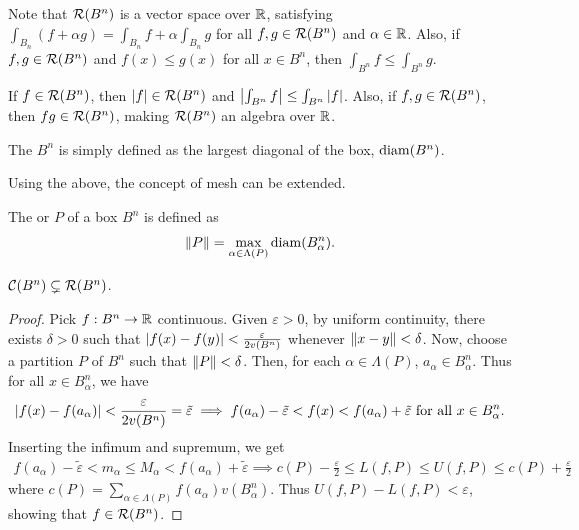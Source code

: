 Note that $\mathcal{R}(B^{n})$ is a vector space over $\mathbb{R}$, satisfying $\int_{B_{n}} (f + \alpha g) = \int_{B_{n}} f + \alpha \int_{B_{n}} g$ for all $f,g \in \mathcal{R}(B^{n})$ and $\alpha \in \mathbb{R}$. Also, if $f,g \in \mathcal{R}(B^{n})$ and $f(x) \leq g(x)$ for all $x \in B^{n}$, then $\int_{B^{n}} f \leq \int_{B^{n}} g$.

If $f \in \mathcal{R}(B^{n})$, then $\left| f \right| \in \mathcal{R}(B^{n})$ and $\left| \int_{B^{n}} f \right| \leq \int_{B^{n}} \left| f \right|$. Also, if $f,g \in \mathcal{R}(B^{n})$, then $fg \in \mathcal{R}(B^{n})$, making $\mathcal{R}(B^{n})$ an algebra over $\mathbb{R}$.

\begin{definition}
    The  $B^{n}$ is simply defined as the largest diagonal of the box, $\operatorname{diam}(B^{n})$.
\end{definition}

Using the above, the concept of mesh can be extended.
\begin{definition}
    The  or  $P$ of a box $B^{n}$ is defined as
    \begin{align}
        \left\lVert P\right\rVert = \max_{\alpha \in \Lambda(P)} \operatorname{diam}(B_{\alpha}^{n}).
    \end{align}
\end{definition}

\begin{theorem}
    $\mathcal{C}(B^{n}) \subsetneq \mathcal{R}(B^{n})$.
\end{theorem}
\begin{proof}
    Pick $f:B^{n} \to \mathbb{R}$ continuous. Given $\varepsilon > 0$, by uniform continuity, there exists $\delta > 0$ such that $\left| f(x) - f(y) \right| < \frac{\varepsilon}{2v(B^{n})}$ whenever $\left\lVert x-y\right\rVert < \delta$. Now, choose a partition $P$ of $B^{n}$ such that $\left\lVert P\right\rVert < \delta$. Then, for each $\alpha \in \Lambda(P)$, $a_{\alpha} \in B_{\alpha}^{n}$. Thus for all $x \in B_{\alpha}^{n}$, we have
    \begin{align}
        \left| f(x)-f(a_{\alpha}) \right| < \frac{\varepsilon}{2v(B^{n})} = \tilde{\varepsilon} \implies f(a_{\alpha}) - \tilde{\varepsilon} < f(x) < f(a_{\alpha}) + \tilde{\varepsilon} \text{ for all } x \in B_{\alpha}^{n}.
    \end{align}
    Inserting the infimum and supremum, we get
    \begin{align}
        f(a_{\alpha}) - \tilde{\varepsilon} < m_{\alpha} \leq M_{\alpha} < f(a_{\alpha}) + \tilde{\varepsilon} \implies c(P) - \frac{\varepsilon}{2} \leq L(f,P) \leq U(f,P) \leq c(P) + \frac{\varepsilon}{2}
    \end{align}
    where $c(P) = \sum_{\alpha \in \Lambda(P)} f(a_{\alpha}) v(B_{\alpha}^{n})$. Thus $U(f,P) - L(f,P) < \varepsilon$, showing that $f \in \mathcal{R}(B^{n})$.
\end{proof}

